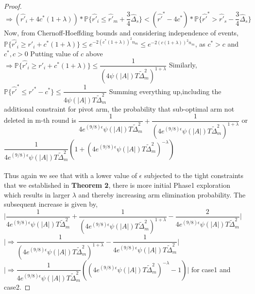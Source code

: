 \begin{proof}
\newline
\hspace*{8em}$\Rightarrow (\hat{r'}_{i} + 4c^{*}(1+\lambda))*\mathbb{P}\lbrace \hat{r'}_{i} \leq \hat{r'}_{m} + \dfrac{3}{4}\hat{\Delta}_{s}\rbrace < (\hat{r'}^{*} - 4c^{*})*\mathbb{P}\lbrace \hat{r'}^{*} > \hat{r'}_{s} - \dfrac{3}{4}\hat{\Delta}_{s} \rbrace$
\newline
Now, from Chernoff-Hoeffding bounds and considering independence of events,
\newline 
\hspace*{8em}$\mathbb{P}\lbrace\hat{r'}_{i} \geq r'_{i} + c^{*}( 1 + \lambda)\rbrace \leq e^{-2(c^{*}(1+\lambda))^{2}n_{m}}\leq e^{-2(c(1+\lambda))^{2}n_{m}}$, as $c^{*} > c$ and $c^{*},c>0$
\newline Putting value of $c$ above
\newline\hspace*{8em} $\Rightarrow \mathbb{P} \lbrace  \hat{r'}_{i} \geq r'_{i} + c^{*}( 1 + \lambda) \rbrace \leq \dfrac{1}{(4\psi(|A|)T\tilde{\Delta}_{m}^{2})^{1+\lambda}}$
\newline Similarly, $\mathbb{P} \lbrace \hat{r'}^{*} \leq r'^{*} - c^{*} \rbrace\leq \dfrac{1}{4\psi(|A|)T\tilde{\Delta}_{m}^{2}}$
\newline
Summing everything up,including the additional constraint for pivot arm, the probability that sub-optimal arm not deleted in m-th round is $\dfrac{1}{4 e^{(9/8)\epsilon} \psi(|A|)T\tilde{\Delta}_{m}^{2}} + \dfrac{1}{(4 e^{(9/8)\epsilon} \psi(|A|)T\tilde{\Delta}_{m}^{2})^{1+\lambda}}$ or $\dfrac{1}{4 e^{(9/8)\epsilon} \psi(|A|)T\tilde{\Delta}_{m}^{2}}(1+(4e^{(9/8)\epsilon} \psi(|A|)T\tilde{\Delta}_{m}^{2})^{-\lambda})$
\paragraph*{}Thus again we see that with a lower value of $\epsilon$  subjected to the tight constraints that we established in \textbf{Theorem 2}, there is more initial Phase1 exploration which results in larger $\lambda$ and thereby increasing arm elimination probability. The subsequent increase is given by,
\newline
\hspace*{8em}$\bigg|\dfrac{1}{4e^{(9/8)\epsilon}\psi(|A|)T\tilde{\Delta}_{m}^{2}} + \dfrac{1}{(4e^{(9/8)\epsilon}\psi(|A|)T\tilde{\Delta}_{m}^{2})^{1+\lambda}} - \dfrac{2}{4e^{(9/8)\epsilon}\psi(|A|)T\tilde{\Delta}_{m}^{2}}\bigg | $ 
\newline
\hspace*{8em}$\bigg|\Rightarrow\dfrac{1}{(4e^{(9/8)\epsilon}\psi(|A|)T\tilde{\Delta}_{m}^{2})^{1+\lambda}} - \dfrac{1}{4e^{(9/8)\epsilon}\psi(|A|)T\tilde{\Delta}_{m}^{2}}\bigg |$ 
\newline
\hspace*{8em}$\bigg|\Rightarrow\dfrac{1}{4e^{(9/8)\epsilon}\psi(|A|)T\tilde{\Delta}_{m}^{2}}( (4e^{(9/8)\epsilon}\psi(|A|)T\tilde{\Delta}_{m}^{2})^{-\lambda}-1)\bigg|$ for case1 and case2.
\end{proof}

